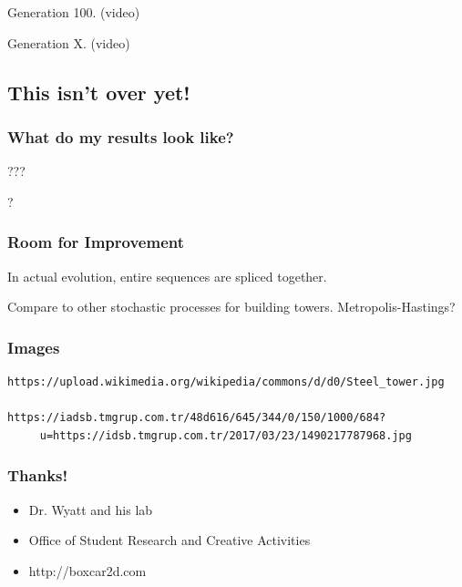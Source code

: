 \documentclass[xcolor=dvipsnames]{beamer}
\begin{document}
\begin{frame}

Generation 100.
(video)

\end{frame}

\begin{frame}

Generation X.
(video)

\end{frame}

\begin{frame}
\section{This isn't over yet!}
\frametitle{What do my results look like?}
\bigskip

???

\bigskip

?
\end{frame}

\begin{frame}
\frametitle{Room for Improvement}

In actual evolution, entire sequences are spliced together.

Compare to other stochastic processes for building towers.  Metropolis-Hastings?
\end{frame}

\begin{frame}[fragile]

\frametitle{Images}

\tiny
\begin{verbatim}
https://upload.wikimedia.org/wikipedia/commons/d/d0/Steel_tower.jpg

https://iadsb.tmgrup.com.tr/48d616/645/344/0/150/1000/684?
     u=https://idsb.tmgrup.com.tr/2017/03/23/1490217787968.jpg
\end{verbatim}

\end{frame}

\begin{frame}
\frametitle{Thanks!}

\begin{itemize}
\item Dr. Wyatt and his lab
\item Office of Student Research and Creative Activities
\item http://boxcar2d.com
\end{itemize}

\end{frame}
\end{document}
